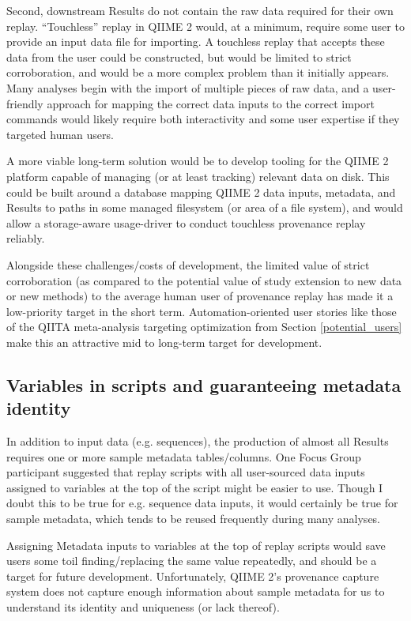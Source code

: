 Second, downstream Results do not contain the raw data required for their own
replay. “Touchless” replay in QIIME 2 would, at a minimum, require some user to
provide an input data file for importing. A touchless replay that accepts these
data from the user could be constructed, but would be limited to strict
corroboration, and would be a more complex problem than it initially appears.
Many analyses begin with the import of multiple pieces of raw data, and a
user-friendly approach for mapping the correct data inputs to the correct import
commands would likely require both interactivity and some user expertise if they
targeted human users.

A more viable long-term solution would be to develop tooling for the QIIME 2
platform capable of managing (or at least tracking) relevant data on disk. This
could be built around a database mapping QIIME 2 data inputs, metadata, and
Results to paths in some managed filesystem (or area of a file system), and
would allow a storage-aware usage-driver to conduct touchless provenance replay
reliably.

Alongside these challenges/costs of development, the limited value of strict
corroboration (as compared to the potential value of study extension to new data
or new methods) to the average human user of provenance replay has made it a
low-priority target in the short term. Automation-oriented user stories like
those of the QIITA meta-analysis targeting optimization from Section \ref{potential_users}
make this an attractive mid to long-term target for development.

\subsection{Variables in scripts and guaranteeing metadata identity \parencite[Issue 44]{keefe_issues_2021}}

In addition to input data (e.g. sequences), the production of almost all Results
requires one or more sample metadata tables/columns. One Focus Group participant
suggested that replay scripts with all user-sourced data inputs assigned to
variables at the top of the script might be easier to use. Though I doubt this
to be true for e.g. sequence data inputs, it would certainly be true for sample
metadata, which tends to be reused frequently during many analyses.

Assigning Metadata inputs to variables at the top of replay scripts would save
users some toil finding/replacing the same value repeatedly, and should be a
target for future development. Unfortunately, QIIME 2’s provenance capture
system does not capture enough information about sample metadata for us to
understand its identity and uniqueness (or lack thereof).

